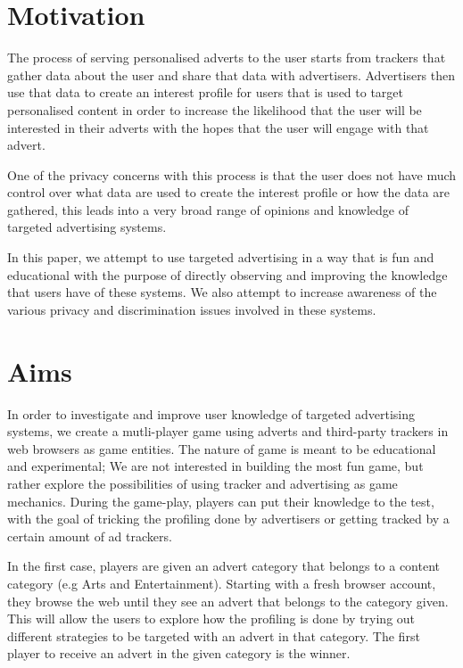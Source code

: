 \documentclass{l4proj}
\begin{document}
\section{Motivation}
The process of serving personalised adverts to the user starts from trackers that gather data about the user and share that data with advertisers. Advertisers then use that data to create an interest profile for users that is used to target personalised content in order to increase the likelihood that the user will be interested in their adverts with the hopes that the user will engage with that advert.

One of the privacy concerns with this process is that the user does not have much control over what data are used to create the interest profile or how the data are gathered, this leads into a very broad range of opinions and knowledge of targeted advertising systems.

In this paper, we attempt to use targeted advertising in a way that is fun and educational with the purpose of directly observing and improving the knowledge that users have of these systems. We also attempt to increase awareness of the various privacy and discrimination issues involved in these systems.

\section{Aims}
In order to investigate and improve user knowledge of targeted advertising systems, we create a mutli-player game using adverts and third-party trackers in web browsers as game entities. The nature of game is meant to be educational and experimental; We are not interested in building the most fun game, but rather explore the possibilities of using tracker and advertising as game mechanics. During the game-play, players can put their knowledge to the test, with the goal of tricking the profiling done by advertisers or getting tracked by a certain amount of ad trackers. 

In the first case, players are given an advert category that belongs to a content category (e.g Arts and Entertainment). Starting with a fresh browser account, they browse the web until they see an advert that belongs to the category given. This will allow the users to explore how the profiling is done by trying out different strategies to be targeted with an advert in that category. The first player to receive an advert in the given category is the winner. 
\end{document}
